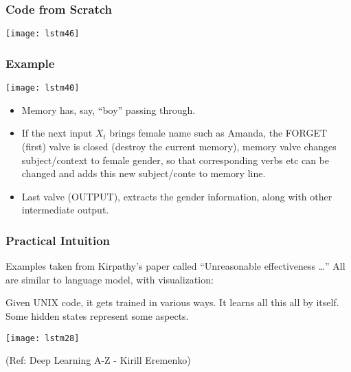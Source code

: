 \begin{frame}[fragile] \frametitle{Code from Scratch}
\begin{center}
\texttt{[image: lstm46]}
\end{center}
\end{frame}

\begin{frame}[fragile] \frametitle{Example}
\begin{center}
\texttt{[image: lstm40]}
\end{center}
\begin{itemize}
\item Memory has, say, ``boy'' passing through.
\item If the next input $X_t$ brings female name such as Amanda, the FORGET (first) valve is closed (destroy the current memory), memory valve changes subject/context to female gender, so that corresponding verbs etc can be changed and adds this new subject/conte to memory line.
\item Last valve (OUTPUT), extracts the gender information, along with other intermediate output.
\end{itemize}
\end{frame}


\begin{frame}[fragile] \frametitle{Practical Intuition}

Examples taken from Kirpathy's paper called ``Unreasonable effectiveness \ldots''
All are similar to language model, with visualization:

Given UNIX code, it gets trained in various ways. It learns all this all  by itself. Some hidden states represent some aspects.
\begin{center}
\texttt{[image: lstm28]}

\tiny{(Ref: Deep Learning A-Z - Kirill Eremenko)}
\end{center}


\end{frame}

